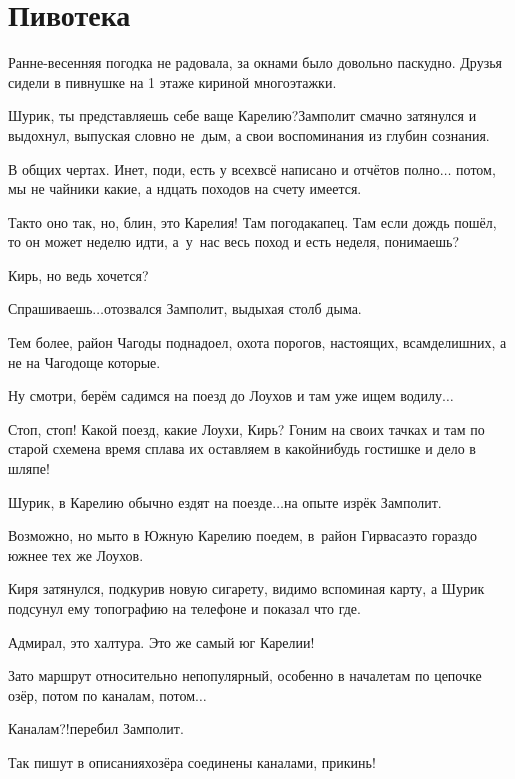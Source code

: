 \chapter{Пивотека}
\vepsianrose

Ранне-весенняя погодка не радовала, за окнами было довольно паскудно. Друзья сидели в пивнушке на 1 этаже кириной многоэтажки.

\diagdash Шурик, ты представляешь себе ваще Карелию?\mdash Замполит смачно затянулся и выдохнул, выпуская словно не~дым, а свои воспоминания из глубин сознания.

\diagdash В общих чертах. Инет, поди, есть у всех\mdash всё написано и отчётов полно$\ldots$ потом, мы не чайники какие, а н\sdash дцать походов на счету имеется.

\diagdash Так\sdash то оно так, но, блин, это Карелия! Там погода\mdash капец. Там если дождь пошёл, то он может неделю идти, а~у~нас весь поход и есть неделя, понимаешь?

\diagdash Кирь, но ведь хочется?

\diagdash Спрашиваешь$\ldots$\mdash отозвался Замполит, выдыхая столб дыма.

\diagdash Тем более, район Чагоды поднадоел, охота порогов, настоящих, всамделишних, а не на Чагодоще которые.

\diagdash Ну смотри, берём садимся на поезд до Лоухов и там уже ищем водилу$\ldots$

\diagdash Стоп, стоп! Какой поезд, какие Лоухи, Кирь? Гоним на своих тачках и там по старой схеме\mdash на время сплава их оставляем в какой\sdash нибудь гостишке и дело в шляпе!

\diagdash Шурик, в Карелию обычно ездят на поезде$\ldots$\mdash на опыте изрёк Замполит.

\diagdash Возможно, но мы\sdash то в Южную Карелию поедем, в~район Гирваса\mdash это гораздо южнее тех же Лоухов.

Киря затянулся, подкурив новую сигарету, видимо вспоминая карту, а Шурик подсунул ему топографию на телефоне и показал что где.

\diagdash Адмирал, это халтура. Это же самый юг Карелии!

\diagdash Зато маршрут относительно непопулярный, особенно в начале\mdash там по цепочке озёр, потом по каналам, потом$\ldots$

\diagdash Каналам?!\mdash перебил Замполит.

\diagdash Так пишут в описаниях\mdash озёра соединены каналами, прикинь!


